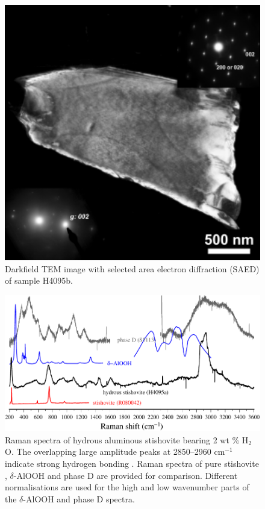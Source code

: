 \documentclass[review]{elsarticle}
\begin{document}
\begin{figure}[ht!]
  \centering
  \includegraphics[width=1.0\textwidth]{figures/H4095b_stv_TEM_darkfield_w_saed.pdf}
  \caption{Darkfield TEM image with selected area electron diffraction (SAED) of sample H4095b.}
  \label{fig:tem}
\end{figure}

\begin{figure}[ht!]
  \centering
  \includegraphics[width=1.0\textwidth]{figures/raman.pdf}
  \caption{Raman spectra of hydrous aluminous stishovite bearing 2 wt \% H$_2$O. The overlapping large amplitude peaks at 2850--2960 cm$^{-1}$ indicate strong hydrogen bonding \citep{Libowitzky1999}. Raman spectra of pure stishovite \citep{RRUFF}, $\delta$-AlOOH \citep{XKFIH2006} and phase D \citep{Pamatoetal2015} are provided for comparison. Different normalisations are used for the high and low wavenumber parts of the $\delta$-AlOOH and phase D spectra.}
  \label{fig:raman}
\end{figure}
\end{document}
